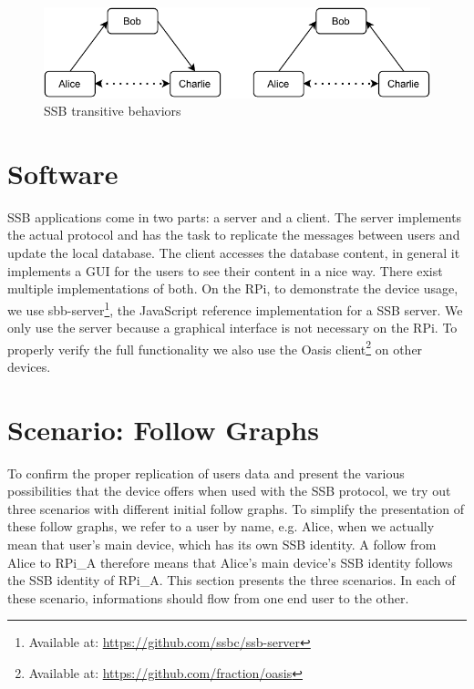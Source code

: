 \documentclass[a4paper,11pt,oneside]{report}
\begin{document}
\begin{figure}
  \includegraphics[width=\linewidth]{figures/transitiveBehavior.pdf}
  \caption{SSB transitive behaviors}
  \label{fig:transitiveBehavior}
\end{figure}


\section{Software}

SSB applications come in two parts: a server and a client. The server implements the actual protocol and has the task to replicate the messages between users and update the local database. The client accesses the database content, in general it implements a GUI for the users to see their content in a nice way. There exist multiple implementations of both. On the RPi, to demonstrate the device usage, we use sbb-server\footnote{Available at: \url{https://github.com/ssbc/ssb-server}}, the JavaScript reference implementation for a SSB server. We only use the server because a graphical interface is not necessary on the RPi. To properly verify the full functionality we also use the Oasis client\footnote{Available at: \url{https://github.com/fraction/oasis}} on other devices.

\section{Scenario: Follow Graphs}
\label{chap:followGraph}

To confirm the proper replication of users data and present the various possibilities that the device offers when used with the SSB protocol, we try out three scenarios with different initial follow graphs. To simplify the presentation of these follow graphs, we refer to a user by name, e.g. Alice, when we actually mean that user's main device, which has its own SSB identity. A follow from Alice to RPi\_A therefore means that Alice's main device's SSB identity follows the SSB identity
of RPi\_A. This section presents the three scenarios. In each of these scenario, informations should flow from one end user to the other.
\end{document}
